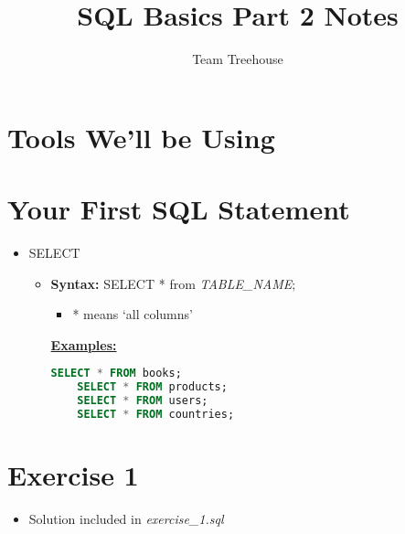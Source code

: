 \documentclass[12pt]{article}
\begin{document}
\title{SQL Basics Part 2 Notes}
\author{Team Treehouse}
\maketitle

\bigskip

\section{Tools We'll be Using}

\bigskip

\section{Your First SQL Statement}

\begin{itemize}
    \item SELECT
    \begin{itemize}
        \item \textbf{Syntax:} SELECT * from \textit{TABLE\_NAME};
        \begin{itemize}
            \item * means `all columns'
        \end{itemize}

        \bigskip

        \underline{\textbf{Examples:}}

    \begin{lstlisting}[language=SQL]
    SELECT * FROM books;
    SELECT * FROM products;
    SELECT * FROM users;
    SELECT * FROM countries;
    \end{lstlisting}
    \end{itemize}
\end{itemize}

\bigskip

\section{Exercise 1}

\bigskip

\begin{itemize}
    \item Solution included in \textit{exercise\_1.sql}
\end{itemize}
\end{document}
